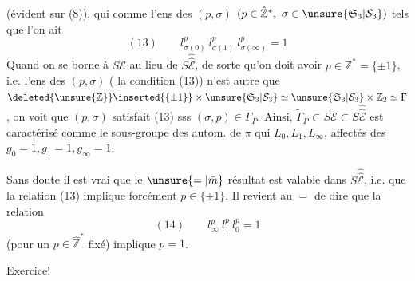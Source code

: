 (évident sur (8)), qui  comme l'ens des $(p,\sigma)$ $(p\in\hat{\mathbb Z}^*,\ \sigma\in\unsure{\mathfrak S_3|\mathcal S_3})$ tels que l'on ait
\[
(13)\qquad l_{\sigma(0)}^p\ l_{\sigma(1)}^p\ l_{\sigma(\infty)}^p=1
\]
Quand on se borne à $S\mathcal E$ au lieu de $S\widehat{\widehat{\mathcal E}}$, de sorte qu'on doit avoir $p\in\mathbb Z^*=\{\pm1\}$,  i.e. l'ens des $(p,\sigma)$ ( la condition (13)) n'est autre que $\deleted{\unsure{\mathbb Z}}\inserted{\{\pm1\}}\times\unsure{\mathfrak S_3|\mathcal S_3}\simeq\unsure{\mathfrak S_3|\mathcal S_3}\times\mathbb Z_2\simeq\Gamma$, on voit que $(p,\sigma)$ satisfait (13) sss $(\sigma,p)\in\Gamma_P$. Ainsi, $\tilde\Gamma_P\subset S\mathcal E\subset S\widehat{\widehat{\mathcal E}}$ est caractérisé comme le sous-groupe  des autom. de $\pi$  qui  $L_0,L_1,L_\infty$, affectés des  $g_0=1,g_1=1,g_\infty=1$.

Sans doute il est vrai que le $\unsure{=|\bar m}$ résultat est valable dans $S\widehat{\widehat{\mathcal E}}$, i.e. que la relation (13) implique forcément $p\in\{\pm1\}$. Il revient au $=$ de dire  que la relation
\[
(14)\qquad l_\infty^p\ l_1^p\ l_0^p=1
\]
(pour un $p\in\hat{\mathbb Z}^*$ fixé) implique $p=1$.

Exercice!
